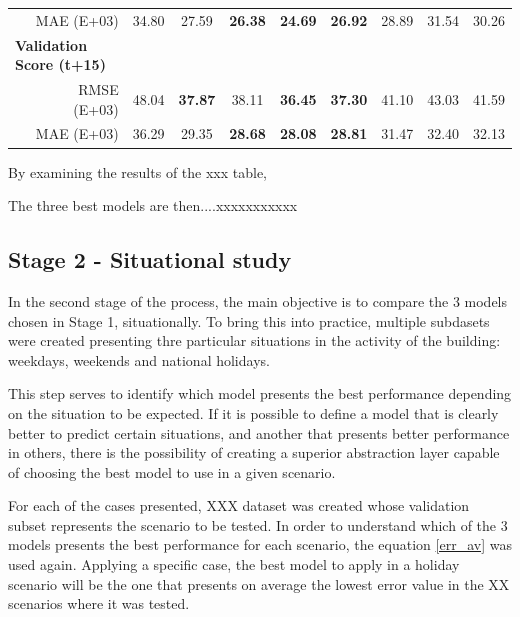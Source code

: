 \begin{table}[htbp]
\begin{tabular}{cr|cccccccc}
          & MAE (E+03) & 34.80 & 27.59 & \textbf{26.38} & \textbf{24.69} & \textbf{26.92} & 28.89 & 31.54 & 30.26 \\
    \multicolumn{2}{l|}{\textbf{Validation Score (t+15)}} &       &       &       &       &       &       &       &  \\
          & RMSE (E+03) & 48.04 & \textbf{37.87} & 38.11 & \textbf{36.45} & \textbf{37.30} & 41.10 & 43.03 & 41.59 \\
          & MAE (E+03) & 36.29 & 29.35 & \textbf{28.68} & \textbf{28.08} & \textbf{28.81} & 31.47 & 32.40 & 32.13 \\
    \end{tabular}%
  \label{tab:addlabel}%
\end{table}%







By examining the results of the xxx table, 

The three best models are then....xxxxxxxxxxx





\subsection{Stage 2 - Situational study}

In the second stage of the process, the main objective is to compare the 3 models chosen in Stage 1, situationally. To bring this into practice, multiple subdasets were created presenting thre particular situations in the activity of the building: weekdays, weekends and national holidays.

This step serves to identify which model presents the best performance depending on the situation to be expected. If it is possible to define a model that is clearly better to predict certain situations, and another that presents better performance in others, there is the possibility of creating a superior abstraction layer capable of choosing the best model to use in a given scenario. 





For each of the cases presented, XXX dataset was created whose validation subset represents the scenario to be tested. In order to understand which of the 3 models presents the best performance for each scenario, the equation \ref{err_av} was used again. Applying a specific case, the best model to apply in a holiday scenario will be the one that presents on average the lowest error value in the XX scenarios where it was tested.

